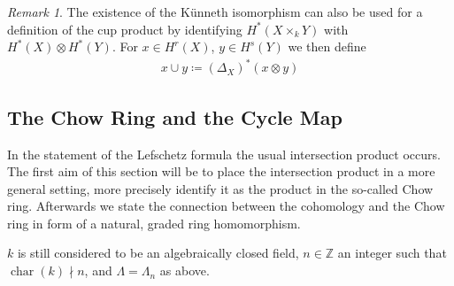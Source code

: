 \documentclass[english]{scrartcl}
\theoremstyle{definition}
\theoremstyle{remark}
\newtheorem{Rem}[Def]{Remark}
\newcommand*{\Z}{\mathds{Z}}
\DeclareMathOperator{\Char}{char} %
\newcommand*{\Diag}[1]{{\Delta_{#1}}} %
\begin{document}
\begin{Rem}\label{rem:cupwithkuennethiso}
  The existence of the Künneth isomorphism can also be used for
  a definition of the cup product by identifying $H^*(X\times_k Y)$
  with $H^*(X)\otimes H^*(Y)$. For $x\in H^r(X)$, $y\in H^s(Y)$
  we then define
  \begin{gather*}
    x\cup y \coloneqq (\Diag{X})^*(x\otimes y)
  \end{gather*}
\end{Rem}

\subsection{The Chow Ring and the Cycle Map}
In the statement of the Lefschetz formula the usual intersection
product occurs. The first aim of this section will be to place the
intersection product in a more general setting, more precisely
identify it as the product in the so-called Chow ring. Afterwards we
state the connection between the cohomology and the Chow ring in form
of a natural, graded ring homomorphism.

$k$ is still considered to be an algebraically closed field,
$n\in\Z$ an integer such that $\Char(k)\nmid n$,
and $\Lambda=\Lambda_n$ as above.
\end{document}
